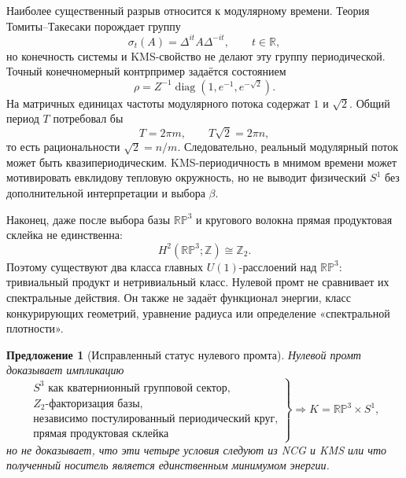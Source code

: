 \documentclass[12pt,a4paper]{report}
\newtheorem{proposition}{Предложение}[chapter]
\theoremstyle{remark}
\DeclareMathOperator{\diag}{diag}
\begin{document}
Наиболее существенный разрыв относится к модулярному времени.
Теория Томиты--Такесаки порождает группу
\begin{equation}
 \sigma_t(A)=\Delta^{it}A\Delta^{-it},
 \qquad t\in\mathbb R,
\end{equation}
но конечность системы и KMS-свойство не делают эту группу периодической.
Точный конечномерный контрпример задаётся состоянием
\begin{equation}
 \rho=Z^{-1}\diag(1,e^{-1},e^{-\sqrt2}).
\end{equation}
На матричных единицах частоты модулярного потока содержат \(1\) и
\(\sqrt2\). Общий период \(T\) потребовал бы
\begin{equation}
 T=2\pi m,
 \qquad
 T\sqrt2=2\pi n,
\end{equation}
то есть рациональности \(\sqrt2=n/m\). Следовательно, реальный модулярный
поток может быть квазипериодическим. KMS-периодичность в мнимом времени
может мотивировать евклидову тепловую окружность, но не выводит физический
\(S^1\) без дополнительной интерпретации и выбора \(\beta\).

Наконец, даже после выбора базы \(\mathbb{RP}^3\) и кругового волокна
прямая продуктовая склейка не единственна:
\begin{equation}
 H^2(\mathbb{RP}^3;\mathbb Z)\cong\mathbb Z_2.
\end{equation}
Поэтому существуют два класса главных \(U(1)\)-расслоений над
\(\mathbb{RP}^3\): тривиальный продукт и нетривиальный класс. Нулевой промт
не сравнивает их спектральные действия. Он также не задаёт функционал
энергии, класс конкурирующих геометрий, уравнение радиуса или определение
«спектральной плотности».

\begin{proposition}[Исправленный статус нулевого промта]
Нулевой промт доказывает импликацию
\begin{equation}
 \left.
 \begin{gathered}
 S^3\text{ как кватернионный групповой сектор},\\
 Z_2\text{-факторизация базы},\\
 \text{независимо постулированный периодический круг},\\
 \text{прямая продуктовая склейка}
 \end{gathered}
 \right\}
 \Longrightarrow
 K=\mathbb{RP}^3\times S^1,
\end{equation}
но не доказывает, что эти четыре условия следуют из NCG и KMS или что
полученный носитель является единственным минимумом энергии.
\end{proposition}
\end{document}
